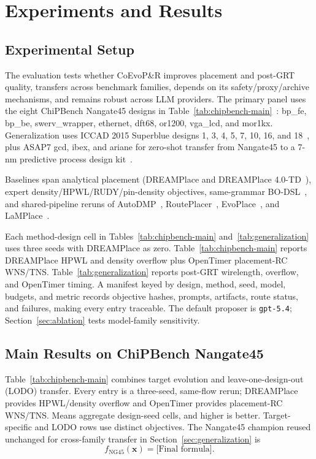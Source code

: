 \section{Experiments and Results}

\subsection{Experimental Setup}

The evaluation tests whether CoEvoP\&R improves placement and post-GRT
quality, transfers across benchmark families, depends on its safety/proxy/archive
mechanisms, and remains robust across LLM providers. The primary panel uses
the eight ChiPBench Nangate45 designs in
Table~\ref{tab:chipbench-main}~\cite{chipbench}: bp\_fe, bp\_be,
swerv\_wrapper, ethernet, dft68, or1200, vga\_lcd, and mor1kx.
Generalization uses ICCAD 2015 Superblue designs 1, 3, 4, 5, 7, 10, 16, and
18~\cite{iccad2015}, plus ASAP7 gcd, ibex, and ariane for zero-shot transfer
from Nangate45 to a 7-nm predictive process design kit~\cite{asap7}.

Baselines span analytical placement (DREAMPlace and DREAMPlace
4.0-TD~\cite{dreamplace,dreamplace4}), expert density/HPWL/RUDY/pin-density
objectives, same-grammar BO-DSL~\cite{tpe}, and shared-pipeline reruns of
AutoDMP~\cite{autodmp}, RoutePlacer~\cite{routeplacer},
EvoPlace~\cite{evoplace}, and LaMPlace~\cite{lamplace}.

Each method-design cell in Tables~\ref{tab:chipbench-main}
and~\ref{tab:generalization} uses three seeds with DREAMPlace as zero.
Table~\ref{tab:chipbench-main} reports DREAMPlace HPWL and density overflow plus
OpenTimer placement-RC WNS/TNS. Table~\ref{tab:generalization} reports post-GRT
wirelength, overflow, and OpenTimer timing.
A manifest keyed by design, method, seed, model, budgets, and metric records
objective hashes, prompts, artifacts, route status, and failures, making every
entry traceable. The default proposer is \texttt{gpt-5.4};
Section~\ref{sec:ablation} tests model-family sensitivity.

\subsection{Main Results on ChiPBench Nangate45}
\label{sec:main-results}

Table~\ref{tab:chipbench-main} combines target evolution and leave-one-design-out
(LODO) transfer. Every entry is a three-seed, same-flow rerun; DREAMPlace
provides HPWL/density overflow and OpenTimer provides placement-RC WNS/TNS.
Means aggregate design-seed cells, and higher is better. Target-specific and
LODO rows use distinct objectives. The Nangate45 champion reused
unchanged for cross-family transfer in Section~\ref{sec:generalization} is
\begin{equation}
f_{\mathrm{NG45}}(\mathbf{x})=\text{[Final formula]}.
\label{eq:final-objective}
\end{equation}

